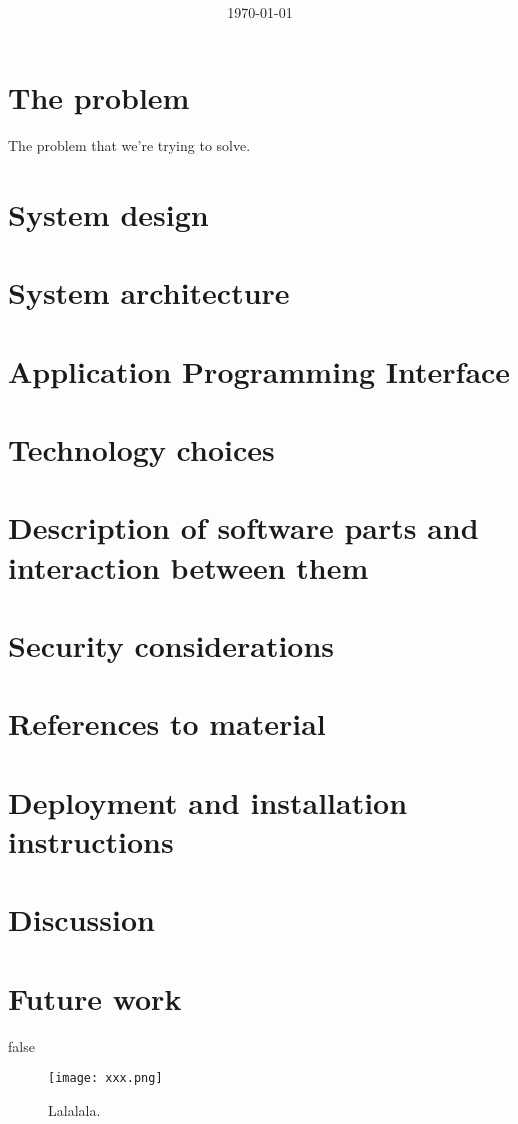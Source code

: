 \documentclass{article}
\title{
    \coursecode{} \\
    \coursename{} \\
    \vspace{1.8em}
    \textbf{\projectname{}} \break
    \author{
        \authorsinfo{}
    } \break{}
    \schoolinfo{}}
\date{\today}
\begin{document}
\maketitle
\newpage

\tableofcontents
\newpage
\section{The problem}
The problem that we're trying to solve.
\section{System design}
\section{System architecture}
\section{Application Programming Interface}
\section{Technology choices}
\section{Description of software parts and interaction between them}
\section{Security considerations}
\section{References to material}
\section{Deployment and installation instructions}
\section{Discussion}
\section{Future work}


\if false

\begin{figure}[H]
    \centering
    \texttt{[image: xxx.png]}
    \caption{Lalalala.}
    \label{fig:my_label}
\end{figure}
\end{document}
